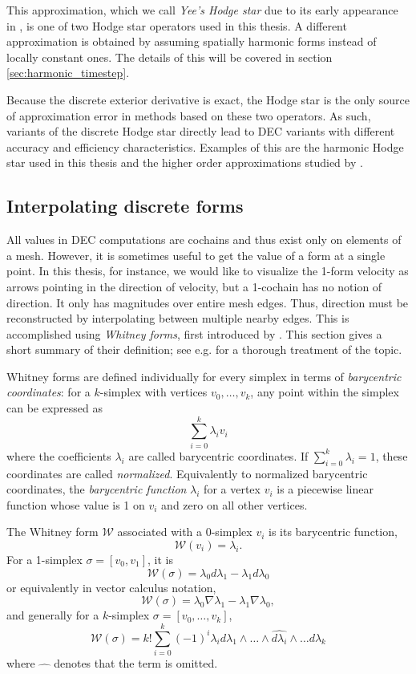 \documentclass[utf8,english]{gradu3}
\begin{document}
This approximation, which we call \textit{Yee's Hodge star}
due to its early appearance in \textcite{yee_numerical_1966},
is one of two Hodge star operators used in this thesis.
A different approximation is obtained by assuming spatially harmonic forms
instead of locally constant ones.
The details of this will be covered in section \ref{sec:harmonic_timestep}.

Because the discrete exterior derivative is exact,
the Hodge star is the only source of approximation error
in methods based on these two operators.
As such, variants of the discrete Hodge star directly lead to
DEC variants with different accuracy and efficiency characteristics.
Examples of this are the harmonic Hodge star used in this thesis
and the higher order approximations studied by \textcite{lohi_higher_2023}.

\subsection{Interpolating discrete forms}\label{sec:interpolation}

All values in DEC computations are cochains
and thus exist only on elements of a mesh.
However, it is sometimes useful to get the value of a form at a single point.
In this thesis, for instance, we would like to visualize
the 1-form velocity as arrows pointing in the direction of velocity,
but a 1-cochain has no notion of direction.
It only has magnitudes over entire mesh edges.
Thus, direction must be reconstructed by interpolating between multiple nearby edges.
This is accomplished using \textit{Whitney forms},
first introduced by \textcite{whitney_geometric_1957}.
This section gives a short summary of their definition;
see e.g. \textcite{lohi_whitney_2021} for a thorough treatment of the topic.

Whitney forms are defined individually for every simplex
in terms of \textit{barycentric coordinates}:
for a $k$-simplex with vertices $v_0, \dots, v_k$,
any point within the simplex can be expressed as
\[
  \sum_{i=0}^k \lambda_i v_i
\]
where the coefficients $\lambda_i$ are called barycentric coordinates.
If $\sum_{i=0}^k \lambda_i = 1$, these coordinates are called \textit{normalized}.
Equivalently to normalized barycentric coordinates,
the \textit{barycentric function} $\lambda_i$ for a vertex $v_i$
is a piecewise linear function whose value is 1 on $v_i$
and zero on all other vertices.

The Whitney form $\mathcal{W}$ associated with a 0-simplex $v_i$
is its barycentric function,
\[
  \mathcal{W}(v_i) = \lambda_i.
\]
For a 1-simplex $\sigma = [v_0,v_1]$, it is
\[
  \mathcal{W}(\sigma) = \lambda_0 d\lambda_1 - \lambda_1 d\lambda_0
\]
or equivalently in vector calculus notation,
\[
  \mathcal{W}(\sigma) = \lambda_0 \nabla\lambda_1 - \lambda_1 \nabla\lambda_0,
\]
and generally for a $k$-simplex $\sigma = [v_0,\dots,v_k]$,
\begin{equation}
  \mathcal{W}(\sigma) = k! \sum_{i=0}^{k} (-1)^i
    \lambda_i d\lambda_1 \wedge \dots \wedge \widehat{d\lambda_i}
    \wedge \dots d\lambda_k
\end{equation}
where $\widehat{\quad}$ denotes that the term is omitted.
\end{document}
